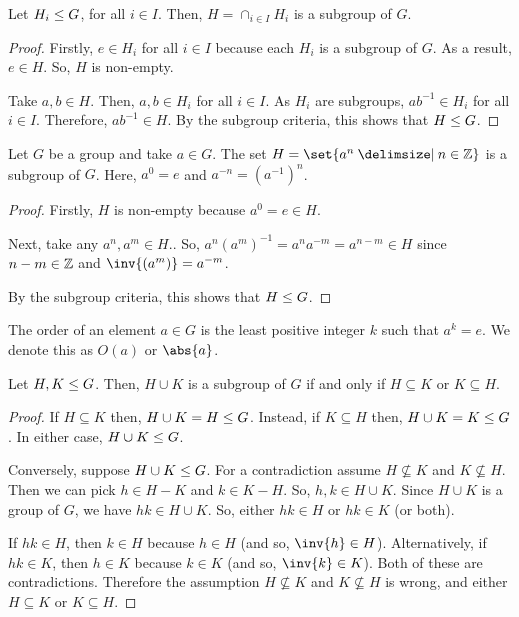 \documentclass[11pt]{penrose}
\begin{document}
\begin{nthm}
    Let $H_i \mathrel{\leq} G$, for all $i \in I$. Then, $H = \cap_{i \in I} H_i$ is a subgroup of $G$.
\end{nthm}
\begin{proof}
    Firstly, $e \in H_i$ for all $i \in I$ because each $H_i$ is a subgroup of $G$. As a result, $e \in H$. So, $H$ is non-empty.

    Take $a, b \in H$. Then, $a, b \in H_i$ for all $i \in I$. As $H_i$ are subgroups, $ab^{-1} \in H_i$ for all $i \in I$. Therefore, $ab^{-1} \in H$. By the subgroup criteria, this shows that $H \mathrel{\leq} G$.
\end{proof}

\begin{nthm}
    Let $G$ be a group and take $a \in G$. The set $H = \set{a^n \st n \in \Z}$ is a subgroup of $G$. Here, $a^0 = e$ and $a^{-n} = \left(a^{-1}\right)^{n}$.
\end{nthm}
\begin{proof}
    Firstly, $H$ is non-empty because $a^0 = e \in H$.

    Next, take any $a^{n}, a^{m} \in H$.. So, $a^{n} (a^{m})^{-1} = a^{n} a^{-m} = a^{n - m} \in H$ since $n - m \in \mathbb{Z}$ and $\inv{(a^{m})} = a^{-m}$.

    By the subgroup criteria, this shows that $H \mathrel{\leq} G$.
\end{proof}

\begin{ndfn}
    The order of an element $a \in G$ is the least positive integer $k$ such that $a^k = e$. We denote this as $O(a)$ or $\abs{a}$.
\end{ndfn}

\begin{nthm}
    Let $H, K \mathrel{\leq} G$. Then, $H \cup K$ is a subgroup of $G$ if and only if $H \subseteq K$ or $K \subseteq H$.
\end{nthm}
\begin{proof}
    If $H \subseteq K$ then, $H \cup K = H \mathrel{\leq} G$. Instead, if $K \subseteq H$ then, $H \cup K = K \mathrel{\leq} G$. In either case, $H \cup K \mathrel{\leq} G$.

    Conversely, suppose $H \cup K \mathrel{\leq} G$. For a contradiction assume $H \nsubseteq K$ and $K \nsubseteq H$. Then we can pick $h \in H - K$ and $k \in K - H$. So, $h, k \in H \cup K$. Since $H \cup K$ is a group of $G$, we have $hk \in H \cup K$. So, either $hk \in H$ or $hk \in K$ (or both).

    If $hk \in H$, then $k \in H$ because $h \in H$ (and so, $\inv{h} \in H$). Alternatively, if $hk \in K$, then $h \in K$ because $k \in K$ (and so, $\inv{k} \in K$). Both of these are contradictions. Therefore the assumption $H \nsubseteq K$ and $K \nsubseteq H$ is wrong, and either $H \subseteq K$ or $K \subseteq H$.
\end{proof}
\end{document}
